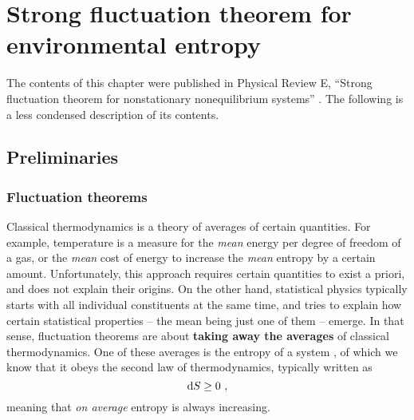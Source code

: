 \chapter{Strong fluctuation theorem for environmental entropy}

The contents of this chapter were published in Physical Review E, ``Strong fluctuation theorem for nonstationary nonequilibrium systems'' \cite{bib:thingie-paper}. The following is a less condensed description of its contents.


\section{Preliminaries}



\subsection{Fluctuation theorems}

Classical thermodynamics is a theory of averages of certain quantities. For example, temperature is a measure for the \emph{mean} energy per degree of freedom of a gas, or the \emph{mean} cost of energy to increase the \emph{mean} entropy by a certain amount. Unfortunately, this approach requires certain quantities to exist a priori, and does not explain their origins. On the other hand, statistical physics typically starts with all individual constituents at the same time, and tries to explain how certain statistical properties -- the mean being just one of them -- emerge. In that sense, fluctuation theorems are about \textbf{taking away the averages} of classical thermodynamics. One of these averages is the entropy of a system , of which we know that it obeys the second law of thermodynamics, typically written as
%
\begin{equation}
	\label{eqn:2nd_law_classical}
	\mathrm{d} S \geq 0 ~,
\end{equation}
%
meaning that \emph{on average} entropy is always increasing.

